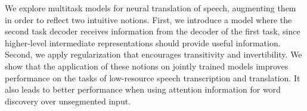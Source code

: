 We explore multitask models for neural translation of speech, augmenting them in order to reflect two intuitive notions. First, we introduce a model where the second task decoder receives information from the decoder of the first task, since higher-level intermediate representations should provide useful information. Second, we apply regularization that encourages transitivity and invertibility. We show that the application of these notions on jointly trained models improves performance on the tasks of low-resource speech transcription and translation. It also leads to better performance when using attention information for word discovery over unsegmented input.
